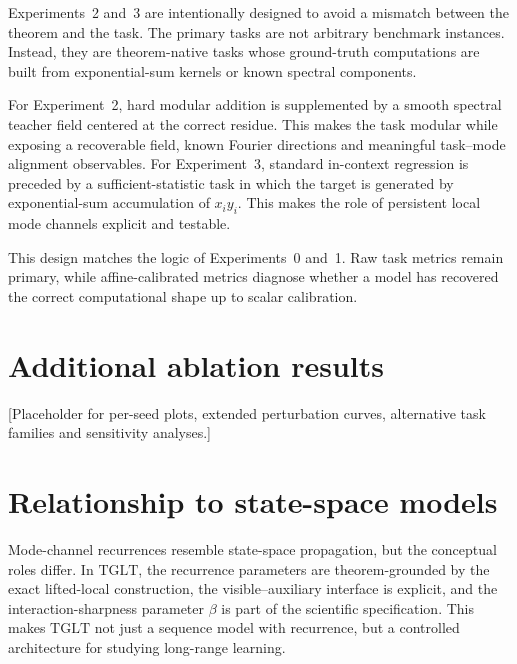 \documentclass[11pt]{article}
\theoremstyle{definition}
\newcommand{\TGLT}{\ensuremath{\mathrm{TGLT}}}
\begin{document}
Experiments~2 and~3 are intentionally designed to avoid a mismatch between the theorem and the task. The primary tasks are not arbitrary benchmark instances. Instead, they are theorem-native tasks whose ground-truth computations are built from exponential-sum kernels or known spectral components.

For Experiment~2, hard modular addition is supplemented by a smooth spectral teacher field centered at the correct residue. This makes the task modular while exposing a recoverable field, known Fourier directions and meaningful task--mode alignment observables. For Experiment~3, standard in-context regression is preceded by a sufficient-statistic task in which the target is generated by exponential-sum accumulation of \(x_i y_i\). This makes the role of persistent local mode channels explicit and testable.

This design matches the logic of Experiments~0 and~1. Raw task metrics remain primary, while affine-calibrated metrics diagnose whether a model has recovered the correct computational shape up to scalar calibration.


\section{Additional ablation results}

[Placeholder for per-seed plots, extended perturbation curves, alternative task families and sensitivity analyses.]

\section{Relationship to state-space models}

Mode-channel recurrences resemble state-space propagation, but the conceptual roles differ. In \TGLT{}, the recurrence parameters are theorem-grounded by the exact lifted-local construction, the visible--auxiliary interface is explicit, and the interaction-sharpness parameter \(\beta\) is part of the scientific specification. This makes \TGLT{} not just a sequence model with recurrence, but a controlled architecture for studying long-range learning.
\end{document}
